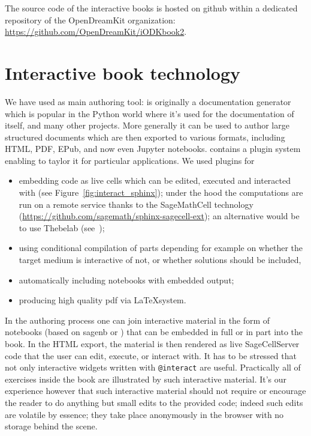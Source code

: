 \documentclass{deliverablereport}
\begin{document}
The source code of the interactive books is hosted on github within a
dedicated repository of the OpenDreamKit organization:
\url{https://github.com/OpenDreamKit/iODKbook2}.


\section{Interactive book technology}

We have used \Sphinx as main authoring tool: \Sphinx is originally a
documentation generator which is popular in the Python world where
it's used for the documentation of \Python itself, and many other
projects. More generally it can be used to author large structured
documents which are then exported to various formats, including HTML,
PDF, EPub, and now even Jupyter notebooks. \Sphinx contains a plugin
system enabling to taylor it for particular applications. We used
plugins for
\begin{itemize}
\item embedding \Sage code as live cells which can be edited, executed
  and interacted with (see Figure~\ref{fig:interact_sphinx}); under
  the hood the computations are run on a remote service thanks to the
  SageMathCell technology (\url{https://github.com/sagemath/sphinx-sagecell-ext});
  an alternative would be to use Thebelab (see~);
\item using conditional compilation of parts depending for example on
  whether the target medium is interactive of not, or whether
  solutions should be included,
\item automatically including \Jupyter notebooks with embedded output;
\item producing high quality pdf via \LaTeX system.
\end{itemize}

In the authoring process one can join interactive material in the form
of notebooks (based on sagenb or \Jupyter) that can be embedded in
full or in part into the \Sphinx book. In the HTML export, the
material is then rendered as live SageCellServer code that the user
can edit, execute, or interact with. It has to be stressed that not
only interactive widgets written with \texttt{@interact} are useful.
Practically all of exercises inside the book are illustrated by such
interactive material. It's our experience however that such
interactive material should not require or encourage the reader to do
anything but small edits to the provided code; indeed such edits are
volatile by essence; they take place anonymously in the browser with
no storage behind the scene.
\end{document}

